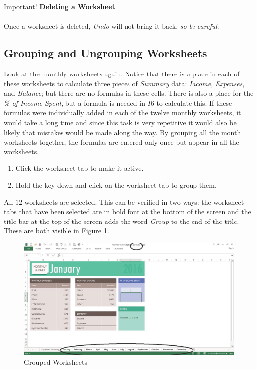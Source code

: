\begin{center}
	\begin{infobox}{Important!}
		\textbf{Deleting a Worksheet}
		\\
		\\
		Once a worksheet is deleted, \textit{Undo} will not bring it back, \textit{so be careful}.
	\end{infobox}
\end{center}

\subsection{Grouping and Ungrouping Worksheets}

Look at the monthly worksheets again. Notice that there is a place in each of these worksheets to calculate three pieces of \textit{Summary} data: \textit{Income}, \textit{Expenses}, and \textit{Balance}; but there are no formulas in these cells. There is also a place for the \textit{\% of Income Spent}, but a formula is needed in $ I6 $ to calculate this. If these formulas were individually added in each of the twelve monthly worksheets, it would take a long time and since this task is very repetitive it would also be likely that mistakes would be made along the way. By grouping all the month worksheets together, the formulas are entered only once but appear in all the worksheets.

\begin{enumbox}
	\begin{enumerate}
		\item Click the  worksheet tab to make it active.
		\item Hold the  key down and click on the  worksheet tab to group them.
	\end{enumerate}
\end{enumbox}

All $ 12 $ worksheets are selected. This can be verified in two ways: the worksheet tabs that have been selected are in bold font at the bottom of the screen and the title bar at the top of the screen adds the word \textit{Group} to the end of the title. These are both visible in Figure \ref{06:fig04}.

\begin{figure}[H]
	\centering
	\includegraphics[width=\maxwidth{.95\linewidth}]{gfx/ch06_fig04}
	\caption{Grouped Worksheets}
	\label{06:fig04}
\end{figure}

